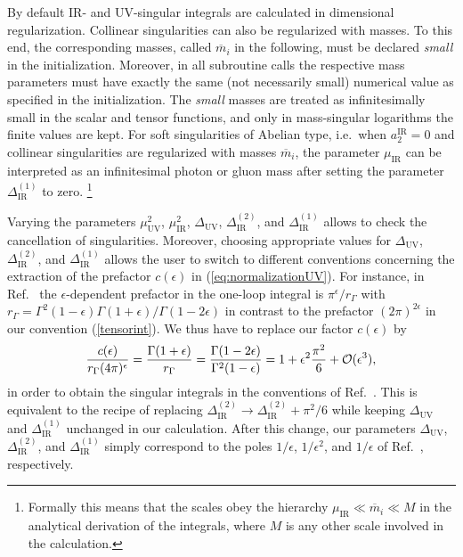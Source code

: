 \documentclass[preprint,sort&compress,12pt]{elsarticle}
\def\beq{\begin{equation}}
\def\eeq{\end{equation}}
\def\Ga{\Gamma}
\def\eps{\epsilon}
\def\refeq#1{\mbox{(\ref{#1})}}
\def\citere#1{\mbox{Ref.~\cite{#1}}}
\newcommand{\ord}{\mathswitch{{\cal{O}}}}
\def\mathswitch#1{\relax\ifmmode#1\else$#1$\fi}
\def\ie{i.e.\ }
\newcommand{\UV}{{\mathrm{UV}}}
\newcommand{\IR}{{\mathrm{IR}}}
\newcommand{\collier}{{\sc Collier}}
\begin{document}
By default IR- and UV-singular integrals are calculated in dimensional
regularization. Collinear singularities can also be regularized with
masses. To this end, the corresponding masses, called $\overline{m}_i$
in the following, must be declared {\it small\/} in the initialization.
Moreover, in all subroutine calls the respective mass parameters must have
exactly the same (not necessarily small) numerical value as specified
in the initialization.
The {\it small\/}
masses are treated as infinitesimally small in the scalar and tensor
functions, and only in mass-singular logarithms 
the finite values
are kept.  For soft singularities of Abelian type, \ie when
$a^{\IR}_2=0$ and collinear singularities are regularized with masses
$\overline{m}_i$, the parameter $\mu_\IR$ can be interpreted as an
infinitesimal photon or gluon mass after setting the parameter
$\Delta^{(1)}_{\IR}$ to zero.%
\footnote{Formally this means that the scales obey the
hierarchy $\mu_\IR\ll \overline{m}_i\ll M$ in the analytical derivation of the
integrals, where $M$ is any other scale involved in the calculation.}

Varying the parameters  $\mu^2_\UV$, $\mu^2_\IR$,
$\Delta_{\UV}$, $\Delta^{(2)}_{\IR}$, and $\Delta^{(1)}_{\IR}$
allows to check the cancellation of
singularities. Moreover, choosing appropriate values for 
$\Delta_{\UV}$, $\Delta^{(2)}_{\IR}$, and $\Delta^{(1)}_{\IR}$
allows the user to switch to different
conventions concerning the extraction of the prefactor $c(\eps)$ in
\refeq{eq:normalizationUV}. 
For instance, in \citere{Ellis:2007qk} the
$\eps$-dependent prefactor in the one-loop integral is $\pi^\eps/r_\Ga$ with
$r_\Ga=\Ga^2(1-\eps)\Ga(1+\eps)/\Ga(1-2\eps)$ in contrast to the prefactor
$(2\pi)^{2\eps}$ in our convention \refeq{tensorint}. We thus have to replace our factor $c(\eps)$ by
\beq
\frac{c(\eps)}{r_\Ga(4\pi)^\eps} =
\frac{\Gamma(1+\eps)}{r_\Ga}=\frac{\Ga(1-2\eps)}{\Ga^2(1-\eps)}=1+\eps^2\frac{\pi^2}{6}+\ord{(\eps^3)},
\eeq
in order to obtain the singular integrals in the conventions of \citere{Ellis:2007qk}.
This is equivalent to the recipe of replacing
$\Delta^{(2)}_{\IR}\to\Delta^{(2)}_{\IR}+\pi^2/6$ while keeping 
$\Delta_{\UV}$ and $\Delta^{(1)}_{\IR}$ unchanged in our calculation.
After this change, our parameters
$\Delta_{\UV}$, $\Delta^{(2)}_{\IR}$, and $\Delta^{(1)}_{\IR}$
simply correspond to the poles $1/\eps$, $1/\eps^2$, and $1/\eps$ of
\citere{Ellis:2007qk}, respectively.
\end{document}
